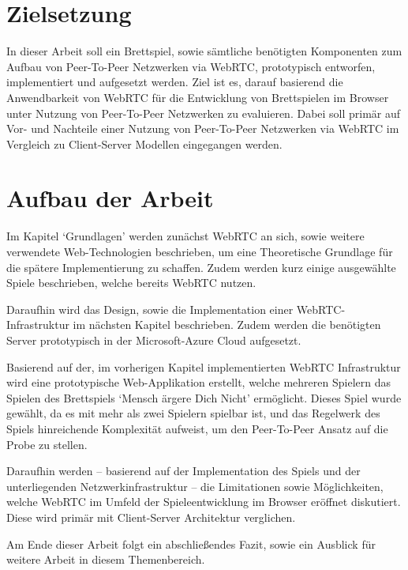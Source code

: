 \section{Zielsetzung}
In dieser Arbeit soll ein Brettspiel, sowie sämtliche benötigten Komponenten zum Aufbau von Peer-To-Peer Netzwerken via \acs{WebRTC}, prototypisch entworfen, implementiert und aufgesetzt werden. Ziel ist es, darauf basierend die Anwendbarkeit von \acs{WebRTC} für die Entwicklung von Brettspielen im Browser unter Nutzung von Peer-To-Peer Netzwerken zu evaluieren. Dabei soll primär auf Vor- und Nachteile einer Nutzung von Peer-To-Peer Netzwerken via \acs{WebRTC} im Vergleich zu Client-Server Modellen eingegangen werden.

\section{Aufbau der Arbeit}
Im Kapitel ‘Grundlagen’ werden zunächst \acs{WebRTC} an sich, sowie weitere verwendete Web-Technologien beschrieben, um eine Theoretische Grundlage für die spätere Implementierung zu schaffen. Zudem werden kurz einige ausgewählte Spiele beschrieben, welche bereits WebRTC nutzen.\par

Daraufhin wird das Design, sowie die Implementation einer \acs{WebRTC}-Infrastruktur im nächsten Kapitel beschrieben. Zudem werden die benötigten Server prototypisch in der Microsoft-Azure Cloud aufgesetzt.\par

Basierend auf der, im vorherigen Kapitel implementierten WebRTC Infrastruktur wird eine prototypische Web-Applikation erstellt, welche mehreren Spielern das Spielen des Brettspiels ‘Mensch ärgere Dich Nicht’ ermöglicht. Dieses Spiel wurde gewählt, da es mit mehr als zwei Spielern spielbar ist, und das Regelwerk des Spiels hinreichende Komplexität aufweist, um den Peer-To-Peer Ansatz auf die Probe zu stellen.\par

Daraufhin werden -- basierend auf der Implementation des Spiels und der unterliegenden Netzwerkinfrastruktur -- die Limitationen sowie Möglichkeiten, welche WebRTC im Umfeld der Spieleentwicklung im Browser eröffnet diskutiert. Diese wird primär mit Client-Server Architektur verglichen.\par

Am Ende dieser Arbeit folgt ein abschließendes Fazit, sowie ein Ausblick für weitere Arbeit in diesem Themenbereich.
